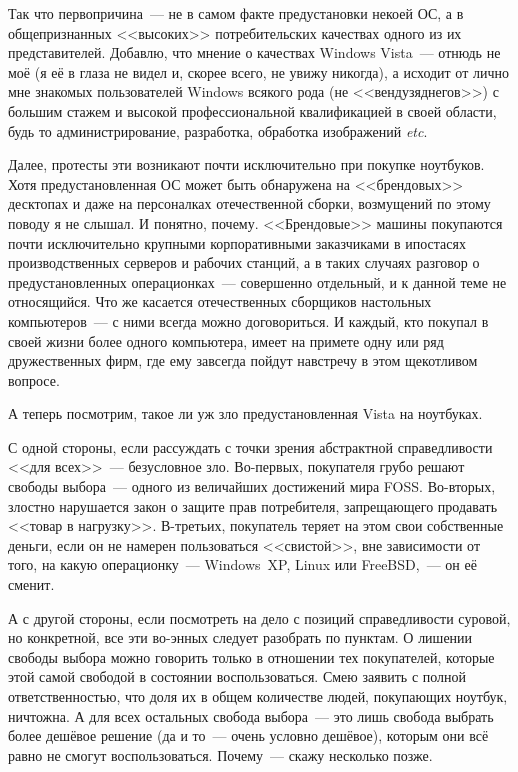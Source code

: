 Так что первопричина~--- не в самом факте предустановки некоей ОС, а в общепризнанных <<высоких>> потребительских качествах одного из их представителей. Добавлю, что мнение о качествах Windows Vista~--- отнюдь не моё (я её в глаза не видел и, скорее всего, не увижу никогда), а исходит от лично мне знакомых пользователей Windows всякого рода (не <<вендузяднегов>>) с большим стажем и высокой профессиональной квалификацией в своей области, будь то администрирование, разработка, обработка изображений \textit{etc}.

Далее, протесты эти возникают почти исключительно при покупке ноутбуков. Хотя предустановленная ОС может быть обнаружена на <<брендовых>> десктопах и даже на персоналках отечественной сборки, возмущений по этому поводу я не слышал. И понятно, почему. <<Брендовые>> машины покупаются почти исключительно крупными корпоративными заказчиками в ипостасях производственных серверов и рабочих станций, а в таких случаях разговор о предустановленных операционках~--- совершенно отдельный, и к данной теме не относящийся. Что же касается отечественных сборщиков настольных компьютеров~--- с ними всегда можно договориться. И каждый, кто покупал в своей жизни более одного компьютера, имеет на примете одну или ряд дружественных фирм, где ему завсегда пойдут навстречу в этом щекотливом вопросе.

А теперь посмотрим, такое ли уж зло предустановленная Vista на ноутбуках.

С одной стороны, если рассуждать с точки зрения абстрактной справедливости <<для всех>>~--- безусловное зло. Во-первых, покупателя грубо решают свободы выбора~--- одного из величайших достижений мира FOSS. Во-вторых, злостно нарушается закон о защите прав потребителя, запрещающего продавать <<товар в нагрузку>>. В-третьих, покупатель теряет на этом свои собственные деньги, если он не намерен пользоваться <<свистой>>, вне зависимости от того, на какую операционку~--- Windows~XP, Linux или FreeBSD,~--- он её сменит.

А с другой стороны, если посмотреть на дело с позиций справедливости суровой, но конкретной, все эти во-энных следует разобрать по пунктам. О лишении свободы выбора можно говорить только в отношении тех покупателей, которые этой самой свободой в состоянии воспользоваться. Смею заявить с полной ответственностью, что доля их в общем количестве людей, покупающих ноутбук, ничтожна. А для всех остальных свобода выбора~--- это лишь свобода выбрать более дешёвое решение (да и то~--- очень условно дешёвое), которым они всё равно не смогут воспользоваться. Почему~--- скажу несколько позже.

